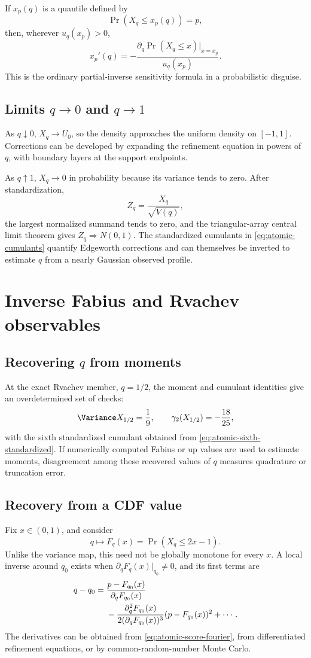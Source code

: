 \documentclass[11pt,letterpaper,oneside,openany]{book}
\theoremstyle{definition}
\theoremstyle{remark}
\begin{document}
If \(x_p(q)\) is a quantile defined by
\[
 \Pr(X_q\le x_p(q))=p,
\]
then, wherever \(u_q(x_p)>0\),
\begin{equation}\label{eq:atomic-quantile-sensitivity}
 x_p'(q)=-\frac{\partial_q\Pr(X_q\le x)|_{x=x_p}}
 {u_q(x_p)}.
\end{equation}
This is the ordinary partial-inverse sensitivity formula in a probabilistic
disguise.

\section{Limits \texorpdfstring{\(q\to0\)}{q to 0} and
\texorpdfstring{\(q\to1\)}{q to 1}}
As \(q\downarrow0\), \(X_q\to U_0\), so the density approaches the uniform
density on \([-1,1]\).  Corrections can be developed by expanding the
refinement equation in powers of \(q\), with boundary layers at the support
endpoints.

As \(q\uparrow1\), \(X_q\to0\) in probability because its variance tends to
zero.  After standardization,
\[
 Z_q=\frac{X_q}{\sqrt{V(q)}},
\]
the largest normalized summand tends to zero, and the triangular-array central
limit theorem gives \(Z_q\Rightarrow N(0,1)\).  The standardized cumulants in
\eqref{eq:atomic-cumulants} quantify Edgeworth corrections and can themselves
be inverted to estimate \(q\) from a nearly Gaussian observed profile.

\chapter{Inverse Fabius and Rvachev observables}

\section{Recovering \texorpdfstring{\(q\)}{q} from moments}
At the exact Rvachev member, \(q=1/2\), the moment and cumulant identities give
an overdetermined set of checks:
\[
 \Variance X_{1/2}=\frac19,
 \qquad
 \gamma_2(X_{1/2})=-\frac{18}{25},
\]
with the sixth standardized cumulant obtained from
\eqref{eq:atomic-sixth-standardized}.  If numerically computed Fabius or up
values are used to estimate moments, disagreement among these recovered
values of \(q\) measures quadrature or truncation error.

\section{Recovery from a CDF value}
Fix \(x\in(0,1)\), and consider
\[
 q\longmapsto F_q(x)=\Pr(X_q\le2x-1).
\]
Unlike the variance map, this need not be globally monotone for every \(x\).
A local inverse around \(q_0\) exists when
\(\partial_qF_q(x)|_{q_0}\ne0\), and its first terms are
\begin{align}
 q-q_0={}&\frac{p-F_{q_0}(x)}{\partial_qF_{q_0}(x)}\notag\\
 &-\frac{\partial_q^2F_{q_0}(x)}
 {2(\partial_qF_{q_0}(x))^3}
 (p-F_{q_0}(x))^2+\cdots.
 \label{eq:fabius-cdf-inverse}
\end{align}
The derivatives can be obtained from
\eqref{eq:atomic-score-fourier}, from differentiated refinement equations, or
by common-random-number Monte Carlo.
\end{document}
